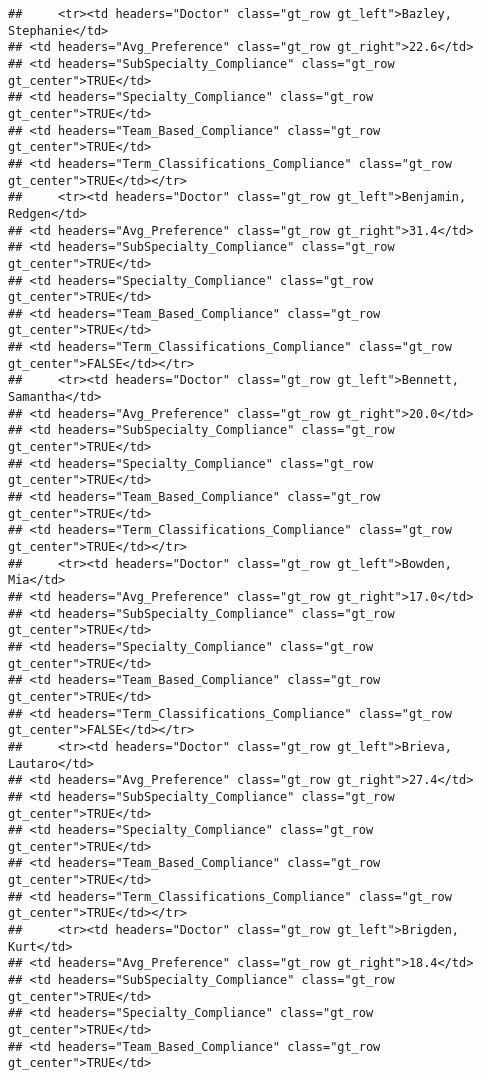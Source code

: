 \documentclass[
]{article}
\begin{document}
\begin{verbatim}
##     <tr><td headers="Doctor" class="gt_row gt_left">Bazley, Stephanie</td>
## <td headers="Avg_Preference" class="gt_row gt_right">22.6</td>
## <td headers="SubSpecialty_Compliance" class="gt_row gt_center">TRUE</td>
## <td headers="Specialty_Compliance" class="gt_row gt_center">TRUE</td>
## <td headers="Team_Based_Compliance" class="gt_row gt_center">TRUE</td>
## <td headers="Term_Classifications_Compliance" class="gt_row gt_center">TRUE</td></tr>
##     <tr><td headers="Doctor" class="gt_row gt_left">Benjamin, Redgen</td>
## <td headers="Avg_Preference" class="gt_row gt_right">31.4</td>
## <td headers="SubSpecialty_Compliance" class="gt_row gt_center">TRUE</td>
## <td headers="Specialty_Compliance" class="gt_row gt_center">TRUE</td>
## <td headers="Team_Based_Compliance" class="gt_row gt_center">TRUE</td>
## <td headers="Term_Classifications_Compliance" class="gt_row gt_center">FALSE</td></tr>
##     <tr><td headers="Doctor" class="gt_row gt_left">Bennett, Samantha</td>
## <td headers="Avg_Preference" class="gt_row gt_right">20.0</td>
## <td headers="SubSpecialty_Compliance" class="gt_row gt_center">TRUE</td>
## <td headers="Specialty_Compliance" class="gt_row gt_center">TRUE</td>
## <td headers="Team_Based_Compliance" class="gt_row gt_center">TRUE</td>
## <td headers="Term_Classifications_Compliance" class="gt_row gt_center">TRUE</td></tr>
##     <tr><td headers="Doctor" class="gt_row gt_left">Bowden, Mia</td>
## <td headers="Avg_Preference" class="gt_row gt_right">17.0</td>
## <td headers="SubSpecialty_Compliance" class="gt_row gt_center">TRUE</td>
## <td headers="Specialty_Compliance" class="gt_row gt_center">TRUE</td>
## <td headers="Team_Based_Compliance" class="gt_row gt_center">TRUE</td>
## <td headers="Term_Classifications_Compliance" class="gt_row gt_center">FALSE</td></tr>
##     <tr><td headers="Doctor" class="gt_row gt_left">Brieva, Lautaro</td>
## <td headers="Avg_Preference" class="gt_row gt_right">27.4</td>
## <td headers="SubSpecialty_Compliance" class="gt_row gt_center">TRUE</td>
## <td headers="Specialty_Compliance" class="gt_row gt_center">TRUE</td>
## <td headers="Team_Based_Compliance" class="gt_row gt_center">TRUE</td>
## <td headers="Term_Classifications_Compliance" class="gt_row gt_center">TRUE</td></tr>
##     <tr><td headers="Doctor" class="gt_row gt_left">Brigden, Kurt</td>
## <td headers="Avg_Preference" class="gt_row gt_right">18.4</td>
## <td headers="SubSpecialty_Compliance" class="gt_row gt_center">TRUE</td>
## <td headers="Specialty_Compliance" class="gt_row gt_center">TRUE</td>
## <td headers="Team_Based_Compliance" class="gt_row gt_center">TRUE</td>

\end{verbatim}
\end{document}
